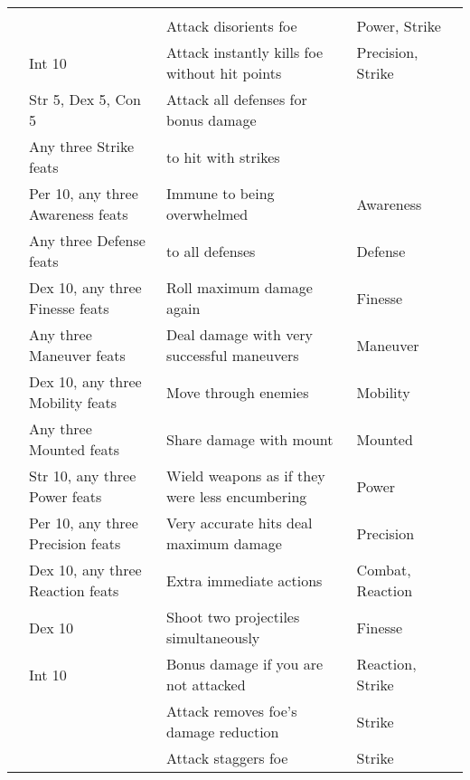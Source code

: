 \begin{longtabuwrapper}
\begin{longtabu}{>{\lcol}p{10em} >{\lcol}p{15em} >{\lcol}X >{\lcol}p{8em} >{\lcol}p{3em}}
        \midrule
         &  &  &  &  \\
         & \x & Attack disorients foe & Power, Strike &  \\
         & Int 10 & Attack instantly kills foe without hit points & Precision, Strike &  \\
         & Str 5, Dex 5, Con 5 & Attack all defenses for bonus damage & \x &  \\
         & Any three Strike feats &  to hit with strikes & \x &  \\
         & Per 10, any three Awareness feats & Immune to being overwhelmed & Awareness &  \\
         & Any three Defense feats &  to all defenses & Defense &  \\
         & Dex 10, any three Finesse feats & Roll maximum damage again & Finesse &  \\
         & Any three Maneuver feats & Deal damage with very successful maneuvers & Maneuver &  \\
         & Dex 10, any three Mobility feats & Move through enemies & Mobility&  \\
         & Any three Mounted feats & Share damage with mount & Mounted&  \\
         & Str 10, any three Power feats & Wield weapons as if they were less encumbering & Power&  \\
         & Per 10, any three Precision feats & Very accurate hits deal maximum damage & Precision &  \\
         & Dex 10, any three Reaction feats & Extra immediate actions & Combat, Reaction &  \\
         & Dex 10 & Shoot two projectiles simultaneously & Finesse &  \\
         & Int 10 & Bonus damage if you are not attacked & Reaction, Strike &  \\
         & \x & Attack removes foe's damage reduction & Strike &  \\
         & \x & Attack staggers foe & Strike &  \\


\end{longtabu}
\end{longtabuwrapper}
